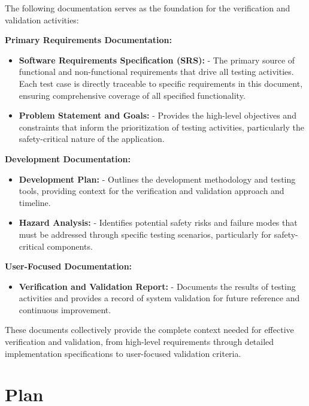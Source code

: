 \documentclass[12pt, titlepage]{article}
\begin{document}
The following documentation serves as the foundation for the verification and
validation activities:

\textbf{Primary Requirements Documentation:}
\begin{itemize}
    \item \textbf{Software Requirements Specification (SRS):} \cite{SRS} - The
    primary source of functional and non-functional requirements that drive all
    testing activities. Each test case is directly traceable to specific
    requirements in this document, ensuring comprehensive coverage of all
    specified functionality.
    
    \item \textbf{Problem Statement and Goals:} \cite{ProblemStatement} -
    Provides the high-level objectives and constraints that inform the
    prioritization of testing activities, particularly the safety-critical
    nature of the application.
\end{itemize}

\textbf{Development Documentation:}
\begin{itemize}
    \item \textbf{Development Plan:} \cite{DevelopmentPlan} - Outlines the
    development methodology and testing tools, providing context for the
    verification and validation approach and timeline.
    
    \item \textbf{Hazard Analysis:} \cite{HazardAnalysis} - Identifies potential
    safety risks and failure modes that must be addressed through specific
    testing scenarios, particularly for safety-critical components.
\end{itemize}

\textbf{User-Focused Documentation:}
\begin{itemize}
    \item \textbf{Verification and Validation Report:} \cite{VnVReport} -
    Documents the results of testing activities and provides a record of system
    validation for future reference and continuous improvement.
\end{itemize}

These documents collectively provide the complete context needed for effective
verification and validation, from high-level requirements through detailed
implementation specifications to user-focused validation criteria.

\section{Plan}
\end{document}
